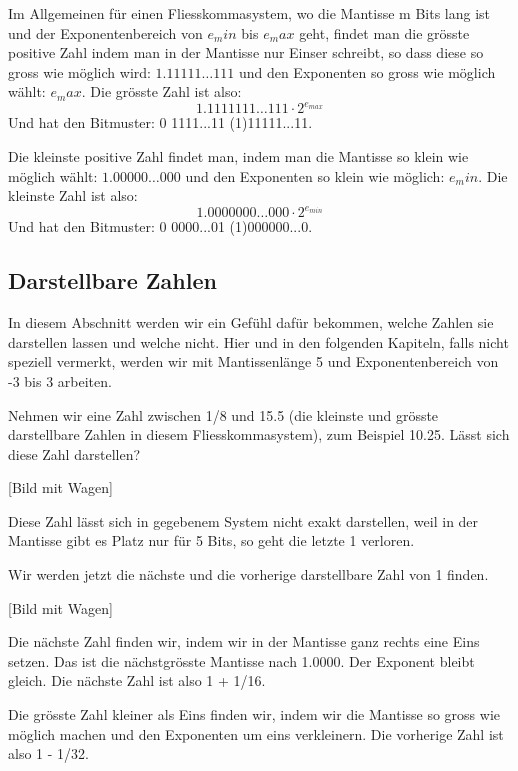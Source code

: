 Im Allgemeinen für einen Fliesskommasystem, wo die Mantisse m Bits lang ist und der Exponentenbereich von \(e_min\) bis \(e_max\) geht, findet man die grösste positive Zahl indem man in der Mantisse nur Einser schreibt, so dass diese so gross wie möglich wird: \(1.11111 \ldots 111\) und den Exponenten so gross wie möglich wählt: \(e_max\). Die grösste Zahl ist also:
\[1.1111111 \ldots 111 \cdot 2^{e_{max}}\]
Und hat den Bitmuster: 0 1111...11 (1)11111...11.

Die kleinste positive Zahl findet man, indem man die Mantisse so klein wie möglich wählt: \(1.00000 \ldots 000\) und den Exponenten so klein wie möglich: \(e_min\). Die kleinste Zahl ist also:
\[1.0000000 \ldots 000 \cdot 2^{e_{min}}\]
Und hat den Bitmuster: 0 0000...01 (1)000000...0.

\subsection{Darstellbare Zahlen}

In diesem Abschnitt werden wir ein Gefühl dafür bekommen, welche Zahlen sie darstellen lassen und welche nicht.
Hier und in den folgenden Kapiteln, falls nicht speziell vermerkt, werden wir mit Mantissenlänge 5 und Exponentenbereich von -3 bis 3 arbeiten.

\begin{beispiel}
Nehmen wir eine Zahl zwischen 1/8 und 15.5 (die kleinste und grösste darstellbare Zahlen in diesem Fliesskommasystem), zum Beispiel 10.25. Lässt sich diese Zahl darstellen?

[Bild mit Wagen]

Diese Zahl lässt sich in gegebenem System nicht exakt darstellen, weil in der Mantisse gibt es Platz nur für 5 Bits, so geht die letzte 1 verloren.
\end{beispiel}

\begin{beispiel}
Wir werden jetzt die nächste und die vorherige darstellbare Zahl von 1 finden.

[Bild mit Wagen]

Die nächste Zahl finden wir, indem wir in der Mantisse ganz rechts eine Eins setzen. Das ist die nächstgrösste Mantisse nach 1.0000. Der Exponent bleibt gleich. Die nächste Zahl ist also 1 + 1/16.

Die grösste Zahl kleiner als Eins finden wir, indem wir die Mantisse so gross wie möglich machen und den Exponenten um eins verkleinern. Die vorherige Zahl ist also 1 - 1/32.
\end{beispiel}

